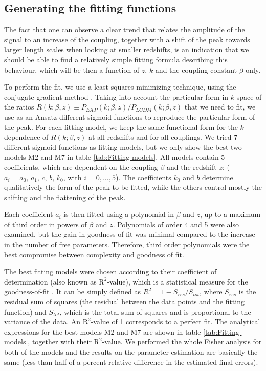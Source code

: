 \subsection{Generating the fitting functions}

\done{}
The fact that one can observe a clear trend that relates the amplitude
of the signal to an increase of the coupling, together with a shift
of the peak towards larger length scales when looking at smaller redshifts,
is an indication that we should be able to find a relatively simple
fitting formula describing this behaviour, which will be then a function
of $z$, $k$ and the coupling constant $\beta$ only.

To perform the fit, we use a least-squares-minimizing technique, using
the conjugate gradient method \cite{weisstein_least_????}. Taking
into account the particular form in $k$-space of the ratios $R(k;\beta,z)\equiv P_{EXP}(k;\beta,z)/P_{LCDM}(k;\beta,z)$
that we need to fit, we use as an Ansatz different sigmoid functions
to reproduce the particular form of the peak. For each fitting model,
we keep the same functional form for the $k$-dependence of $R(k;\beta,z)$
at all redshifts and for all couplings. We tried 7 different sigmoid
functions as fitting models, but we only show the best two models
M2 and M7 in table \ref{tab:Fitting-models}. All models contain 5
coefficients, which are dependent on the coupling $\beta$ and the
redshift $z$: ($a_{i}=a_{0},\, a_{1},\, c,\, b,\, k_{0}$, with $i=0,...,5$).
The coefficients $k_{0}$ and $b$ determine qualitatively the form
of the peak to be fitted, while the others control mostly the shifting
and the flattening of the peak.

Each coefficient $a_{i}$ is then fitted using a polynomial in $\beta$
and $z$, up to a maximum of third order in powers of $\beta$ and
$z$. Polynomials of order 4 and 5 were also examined, but the gain
in goodness of fit was minimal compared to the increase in the number
of free parameters. Therefore, third order polynomials were the best
compromise between complexity and goodness of fit.

The best fitting models were chosen according to their coefficient
of determination (also known as $\mbox{R}^{2}$-value), which is a
statistical measure for the goodness-of-fit \textcolor{green}{\cite{weisstein_correlation_????}}.
It can be simply defined as $R^{2}=1-S_{res}/S_{tot}$, where $S_{res}$
is the residual sum of squares (the residual between the data points
and the fitting function) and $S_{tot}$, which is the total sum of
squares and is proportional to the variance of the data. An $\mbox{R}^{2}$-value
of 1 corresponds to a perfect fit. The analytical expressions for
the best models M2 and M7 are shown in table \ref{tab:Fitting-models},
together with \textcolor{black}{their} $\mbox{R}^{2}$-value. We performed
the whole Fisher analysis for both of the models and the results on the parameter estimation
are basically the same (less than half of a percent relative difference
in the estimated final errors).


